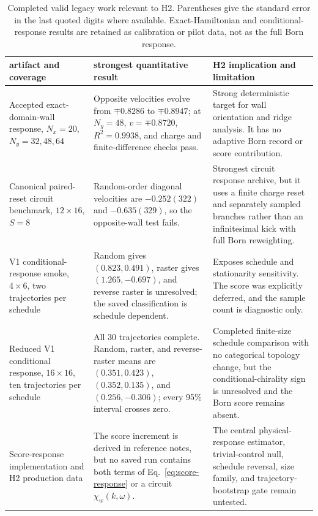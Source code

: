 \documentclass[aps,prx,twocolumn,floatfix,nofootinbib,superscriptaddress,longbibliography]{revtex4-2}
\newcommand{\campaignTableSetup}{%
  \footnotesize
  \setlength{\tabcolsep}{4pt}%
  \renewcommand{\arraystretch}{1.12}%
}
\begin{document}
\begin{table}[t]
\campaignTableSetup
\caption{Completed valid legacy work relevant to H2.  Parentheses give the standard error
in the last quoted digits where available.  Exact-Hamiltonian and conditional-response
results are retained as calibration or pilot data, not as the full Born response.}
\label{tab:H2-legacy}
\begin{tabularx}{\textwidth}{@{}L{0.75}L{1.10}L{1.15}@{}}
\toprule
artifact and coverage & strongest quantitative result & H2 implication and limitation \\
\midrule
Accepted exact-domain-wall response, $N_x=20$, $N_y=32,48,64$
& Opposite velocities evolve from $\mp0.8286$ to $\mp0.8947$; at $N_y=48$,
$v=\mp0.8720$, $R^2=0.9938$, and charge and finite-difference checks pass.
& Strong deterministic target for wall orientation and ridge analysis.  It has no
adaptive Born record or score contribution. \\
Canonical paired-reset circuit benchmark, $12\times16$, $S=8$
& Random-order diagonal velocities are $-0.252(322)$ and $-0.635(329)$, so the
opposite-wall test fails.
& Strongest circuit response archive, but it uses a finite charge reset and separately
sampled branches rather than an infinitesimal kick with full Born reweighting. \\
V1 conditional-response smoke, $4\times6$, two trajectories per schedule
& Random gives $(0.823,0.491)$, raster gives $(1.265,-0.697)$, and reverse raster is
unresolved; the saved classification is schedule dependent.
& Exposes schedule and stationarity sensitivity.  The score was explicitly deferred, and
the sample count is diagnostic only. \\
Reduced V1 conditional response, $16\times16$, ten trajectories per schedule
& All 30 trajectories complete.  Random, raster, and reverse-raster means are
$(0.351,0.423)$, $(0.352,0.135)$, and $(0.256,-0.306)$; every 95\% interval crosses zero.
& Completed finite-size schedule comparison with no categorical topology change, but the
conditional-chirality sign is unresolved and the Born score remains absent. \\
Score-response implementation and H2 production data
& The score increment is derived in reference notes, but no saved run contains both terms
of Eq.~\eqref{eq:score-response} or a circuit $\chi_w(k,\omega)$.
& The central physical-response estimator, trivial-control null, schedule reversal, size
family, and trajectory-bootstrap gate remain untested. \\
\bottomrule
\end{tabularx}
\end{table}
\end{document}
